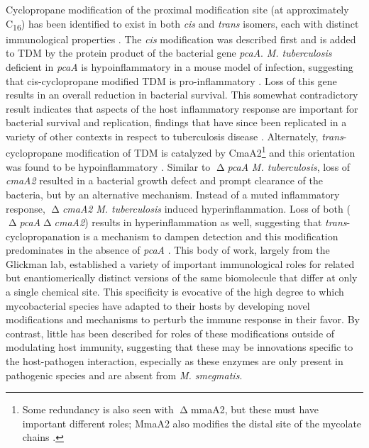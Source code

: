 Cyclopropane modification of the proximal modification site (at approximately C\textsubscript{16}) has been identified to exist in both \textit{cis} and \textit{trans} isomers, each with distinct immunological properties \citep{Glickman2000, Glickman2001a, Rao2005, Rao2006}. The \textit{cis} modification was described first and is added to TDM by the protein product of the bacterial gene \textit{pcaA}. \textit{M. tuberculosis} deficient in \textit{pcaA} is hypoinflammatory in a mouse model of infection, suggesting that cis\hyp{}cyclopropane modified TDM is pro\hyp{}inflammatory \citep{Rao2005}. Loss of this gene results in an overall reduction in bacterial survival. This somewhat contradictory result indicates that aspects of the host inflammatory response are important for bacterial survival and replication, findings that have since been replicated in a variety of other contexts in respect to tuberculosis disease \citep{Huynh2011, Sasindran2011, Tobin2012, Koul2004, Flynn2005}. Alternately, \textit{trans}\hyp{}cyclopropane modification of TDM is catalyzed by CmaA2\footnote{Some redundancy is also seen with $\upDelta$mmaA2, but these must have important different roles; MmaA2 also modifies the distal site of the mycolate chains \citep{Barkan2010, Glickman2003}.} and this orientation was found to be hypoinflammatory \citep{Rao2006}. Similar to $\upDelta$\textit{pcaA} \textit{M. tuberculosis}, loss of \textit{cmaA2} resulted in a bacterial growth defect and prompt clearance of the bacteria, but by an alternative mechanism. Instead of a muted inflammatory response, $\upDelta$\textit{cmaA2} \textit{M. tuberculosis} induced hyperinflammation. Loss of both ($\upDelta$\textit{pcaA}$\upDelta$\textit{cmaA2}) results in hyperinflammation as well, suggesting that \textit{trans}\hyp{}cyclopropanation is a mechanism to dampen detection and this modification predominates in the absence of \textit{pcaA} \citep{Barkan2012}. This body of work, largely from the Glickman lab, established a variety of important immunological roles for related but enantiomerically distinct versions of the same biomolecule that differ at only a single chemical site. This specificity is evocative of the high degree to which mycobacterial species have adapted to their hosts by developing novel modifications and mechanisms to perturb the immune response in their favor. By contrast, little has been described for roles of these modifications outside of modulating host immunity, suggesting that these may be innovations specific to the host\hyp{}pathogen interaction, especially as these enzymes are only present in pathogenic species and are absent from \textit{M. smegmatis}.


